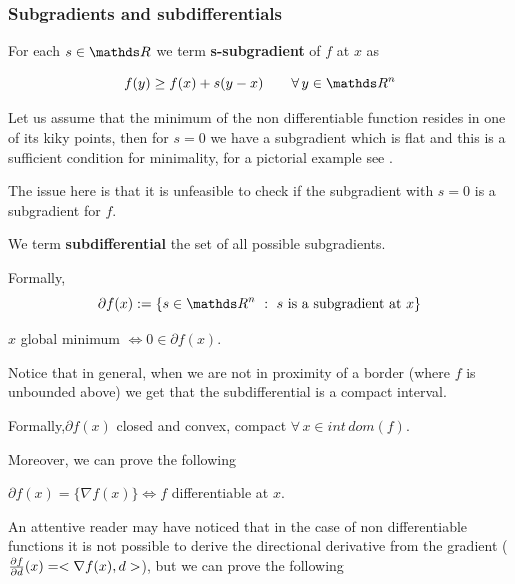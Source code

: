 \documentclass[computationalMathematics.tex]{subfiles}
\begin{document}
\subsubsection{Subgradients and subdifferentials}

\begin{definition}[Subgradient]
  For each $s \in \R$ we term \textbf{s-subgradient} of $f$ at $x$ as
  
\[
  f(y) \geq f(x) + s (y - x) \qquad \forall \, y \in \R^n
\]
\end{definition}

Let us assume that the minimum of the non differentiable function resides in one of its kiky points, then for $s=0$ we have a subgradient which is flat and this is a sufficient condition for minimality, for a pictorial example see .


The issue here is that it is unfeasible to check if the subgradient with $s=0$ is a subgradient for $f$.

\begin{definition}[Subdifferential]
  We term \textbf{subdifferential} the set of all possible subgradients.

  Formally,
  \[
    \partial f(x) := \{s \in \R^n~:~s \text{ is a subgradient at } x\} 
  \]
\end{definition}


\begin{theorem}
$x$ global minimum $\iff 0 \in \partial f(x)$.
\end{theorem}

Notice that in general, when we are not in proximity of a border (where $f$ is unbounded above) we get that the subdifferential is a compact interval.

Formally,$\partial f(x)$ closed and convex, compact $\forall \, x \in int \, dom(f)$.

Moreover, we can prove the following

\begin{proposition}
$\partial f(x) = \{\nabla f(x)\} \iff f$ differentiable at $x$.
\end{proposition}

An attentive reader may have noticed that in the case of non differentiable functions it is not possible to derive the directional derivative from the gradient ($\frac{\partial f}{\partial d}(x) = <\nabla f(x), d>$), but we can prove the following
\end{document}
